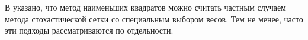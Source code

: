В \cite{Glasserman2004} указано, что метод наименьших квадратов можно считать частным случаем метода стохастической сетки со специальным выбором весов. Тем не менее, часто эти подходы рассматриваются по отдельности.





